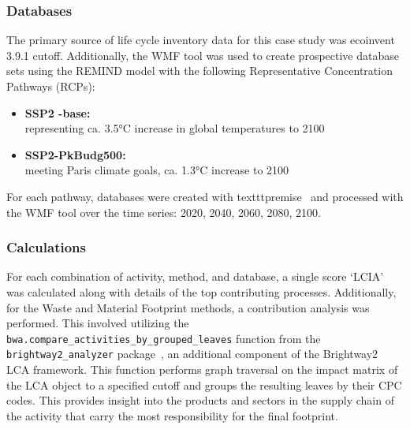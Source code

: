 \subsubsection{Databases}
The primary source of life cycle inventory data for this case study was ecoinvent 3.9.1 cutoff. Additionally, the WMF tool was used to create prospective database sets using the \mbox{REMIND} model with the following Representative Concentration Pathways (RCPs):
\begin{itemize}
    \item \textbf{SSP2 -base:}\\ representing ca. 3.5°C increase in global temperatures to 2100
    \item \textbf{SSP2-PkBudg500:}\\ meeting Paris climate goals, ca. 1.3°C increase to 2100
\end{itemize}

For each pathway, databases were created with texttt{premise}~\citep{sacchi2022premise} and processed with the WMF tool over the time series: 2020, 2040, 2060, 2080, 2100.

\subsubsection{Calculations}
For each combination of activity, method, and database, a single score `LCIA' was calculated along with details of the top contributing processes. Additionally, for the Waste and Material Footprint methods, a contribution analysis was performed. This involved utilizing the \texttt{bwa.compare\_activities\_by\_grouped\_leaves} function from the \texttt{brightway2\_analyzer} package~\cite{mutel2016brightway2analyzer}, an additional component of the Brightway2 LCA framework. This function performs graph traversal on the impact matrix of the LCA object to a specified cutoff and groups the resulting leaves by their CPC codes. This provides insight into the products and sectors in the supply chain of the activity that carry the most responsibility for the final footprint.


